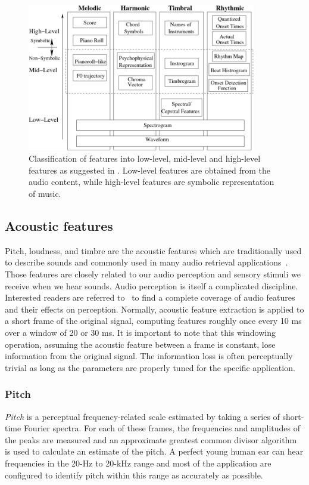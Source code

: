 \begin{figure}[htb]
	\centering
	\includegraphics[width=10cm]{Figures/low-to-high-features.png}
	\caption{Classification of features into low-level, mid-level and high-level
features as suggested in \cite{ramaseshan2013}. Low-level features are obtained from the audio content, while high-level features are symbolic representation of music.}
	\label{low-to-high}
\end{figure}

\subsection{Acoustic features}
Pitch, loudness, and timbre are the acoustic features which are traditionally used to describe sounds and commonly used in many audio retrieval applications~\cite{erling1996, tzanetakis2002, kumar2013}. Those features are closely related to our audio perception and sensory stimuli we receive when we hear sounds. Audio perception is itself a complicated discipline. Interested readers are referred to~\cite{moore2003, bregman1990} to find a complete coverage of audio features and their effects on perception. Normally, acoustic feature extraction is applied to a short frame of the original signal, computing features roughly once every 10 ms over a window of 20 or 30 ms. It is important to note that this windowing operation, assuming the acoustic feature between a frame is constant, lose information from the original signal. The information loss is often perceptually trivial as long as the parameters are properly tuned for the specific application.

\subsubsection{Pitch}
\textit{Pitch} is a perceptual frequency-related scale estimated by taking a series of short-time Fourier spectra. For each of these frames, the frequencies and amplitudes of the peaks are measured and an approximate greatest common divisor algorithm is used to calculate an estimate of the pitch. A perfect young human ear can hear frequencies in the 20-Hz to 20-kHz range and most of the application are configured to identify pitch within this range as accurately as possible.

